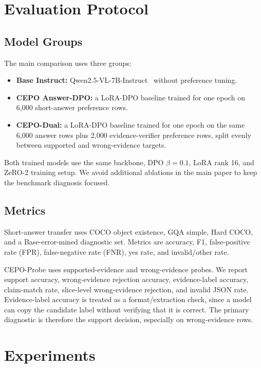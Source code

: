 \documentclass[10pt,twocolumn,letterpaper]{article}
\newcommand{\benchmark}{CEPO-Probe}
\newcommand{\answerdpo}{CEPO Answer-DPO}
\newcommand{\cepodual}{CEPO-Dual}
\begin{document}
\section{Evaluation Protocol}

\subsection{Model Groups}

The main comparison uses three groups:
\begin{itemize}
    \item \textbf{Base Instruct:} Qwen2.5-VL-7B-Instruct~\cite{qwen25vl}
    without preference tuning.
    \item \textbf{\answerdpo{}:} a LoRA-DPO baseline trained for one epoch on
    6{,}000 short-answer preference rows.
    \item \textbf{\cepodual{}:} a LoRA-DPO baseline trained for one epoch on
    the same 6{,}000 answer rows plus 2{,}000 evidence-verifier preference
    rows, split evenly between supported and wrong-evidence targets.
\end{itemize}
Both trained models use the same backbone, DPO $\beta=0.1$, LoRA rank 16, and
ZeRO-2 training setup. We avoid additional ablations in the main paper to keep
the benchmark diagnosis focused.

\subsection{Metrics}

Short-answer transfer uses COCO object existence, GQA simple, Hard COCO, and a
Base-error-mined diagnostic set. Metrics are accuracy, F1, false-positive rate
(FPR), false-negative rate (FNR), yes rate, and invalid/other rate.

\benchmark{} uses supported-evidence and wrong-evidence probes. We report
support accuracy, wrong-evidence rejection accuracy, evidence-label accuracy,
claim-match rate, slice-level wrong-evidence rejection, and invalid JSON rate.
Evidence-label accuracy is treated as a format/extraction check, since a model
can copy the candidate label without verifying that it is correct. The primary
diagnostic is therefore the support decision, especially on wrong-evidence
rows.

\section{Experiments}
\end{document}
